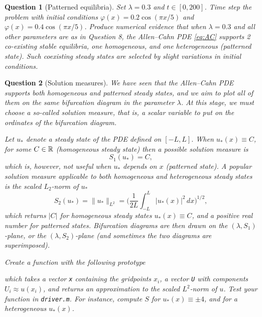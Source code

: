 \documentclass[a4paper]{siamart220329}
\theoremstyle{plain}
\newtheorem{question}{Question}
\begin{document}
\begin{question}[Patterned equilibria]\label{question:patterns}
Set $\lambda = 0.3$ and $t \in [0,200]$. Time step the problem with initial
conditions $\varphi(x)= 0.2\cos(\pi x/ 5)$ and $\varphi(x)= 0.4\cos(\pi x/ 5)$.
Produce numerical evidence that when $\lambda = 0.3$ and all other parameters are as
in Question 8, the Allen--Cahn PDE \cref{eq:AC} supports 2 co-existing stable
equilibria, one homogeneous, and one heterogeneous (patterned state). Such coexisting
steady states are selected by slight variations in initial conditions.
\end{question}

\begin{question}[Solution measures] We have seen that the Allen--Cahn PDE
supports both homogeneous and patterned steady states, and we aim to plot all of them
on the same bifurcation diagram in the parameter $\lambda$. At this stage, we must choose a
so-called \textit{solution measure}, that is, a scalar variable to put on the
ordinates of the bifurcation diagram. 

Let $u_*$ denote a steady state of the PDE defined on $[-L,L]$. When $u_*(x) \equiv
C$, for some $C \in \mathbb{R}$ (homogeneous steady state) then a possible solution measure is
\[
  S_1(u_*) = C, 
\]
which is, however, not useful when $u_*$ depends on $x$ (patterned state). A popular solution
measure applicable to both homogeneous and heterogeneous steady states is the scaled
$L_2$-norm of $u_*$
\[
  S_2(u_*) = \|u_*\|_{L^2}= \bigg( \frac{1}{2L} \int_{-L}^L |u_*(x)|^2\, dx \bigg)^{1/2},
\]
which returns $|C|$ for homogeneous steady states $u_*(x) \equiv C$, and a
positive real number for patterned states. Bifurcation diagrams are then drawn on
the $(\lambda,S_1)$-plane, or the $(\lambda,S_2)$-plane (and sometimes the two
diagrams are superimposed).

Create a function with the following prototype

which takes a vector \lstinline|x| containing the gridpoints $x_i$, a vector
\lstinline|U| with components $U_i \approx
u(x_i)$, and returns an approximation to the scaled $L^2$-norm of $u$. Test your
function in \lstinline|driver.m|. For instance, compute $S$ for $u_*(x) \equiv
\pm 4$, and for a heterogeneous $u_*(x)$.
\end{question}
\end{document}

